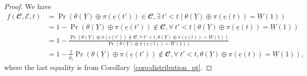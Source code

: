 \documentclass[letterpaper,draftclsnofoot,onecolumn]{IEEEtran}
\begin{document}
\begin{proof}
    We have
    \begin{align}
        f(\mathbfcal{C},\mathcal{E},t) &= \Pr(\theta(\underline{Y})\oplus \pi(\underline{e}(t'))\in \mathbfcal{C},\exists\ t'< t \mid \theta(\underline{Y})\oplus \pi(\underline{e}(t))=\underline{W}(1))\\
        &= 1 - \Pr(\theta(\underline{Y})\oplus \pi(\underline{e}(t'))\notin \mathbfcal{C},\forall\ t'< t \mid \theta(\underline{Y})\oplus \pi(\underline{e}(t))=\underline{W}(1))\\
        &= 1 - \frac{\Pr(\theta(\underline{Y})\oplus \pi(\underline{e}(t'))\notin \mathbfcal{C},\forall\ t'< t, \theta(\underline{Y})\oplus \pi(\underline{e}(t))=\underline{W}(1))}{\Pr(\theta(\underline{Y})\oplus \pi(\underline{e}(t))=\underline{W}(1))}\\
        &= 1 - \frac{1}{p_{t}} \Pr(\theta(\underline{Y})\oplus \pi(\underline{e}(t'))\notin \mathbfcal{C},\forall\ t'< t, \theta(\underline{Y})\oplus \pi(\underline{e}(t))=\underline{W}(1)),\label{eqn:pre-target-hit-prob-joint}
    \end{align}
    where the last equality is from Corollary~\ref{coro:distribution_pt}.


\end{proof}
\end{document}
